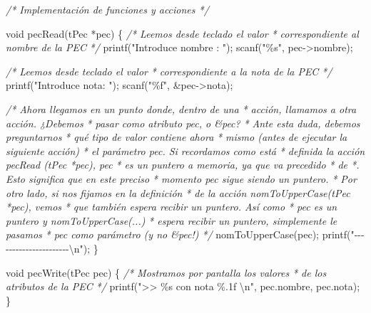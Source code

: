 \documentclass[
]{book}
\newenvironment{Shaded}{\begin{snugshade}}{\end{snugshade}}
\newcommand{\CommentTok}[1]{\textcolor[rgb]{0.56,0.35,0.01}{\textit{#1}}}
\newcommand{\DataTypeTok}[1]{\textcolor[rgb]{0.13,0.29,0.53}{#1}}
\newcommand{\NormalTok}[1]{#1}
\newcommand{\SpecialCharTok}[1]{\textcolor[rgb]{0.00,0.00,0.00}{#1}}
\newcommand{\StringTok}[1]{\textcolor[rgb]{0.31,0.60,0.02}{#1}}
\begin{document}
\begin{Shaded}
\begin{Highlighting}[]
\CommentTok{/* Implementación de funciones y acciones */}

\DataTypeTok{void}\NormalTok{ pecRead(tPec *pec) \{}
    \CommentTok{/* Leemos desde teclado el valor}
\CommentTok{     * correspondiente al nombre de la PEC}
\CommentTok{     */}
\NormalTok{    printf(}\StringTok{"Introduce nombre : "}\NormalTok{);}
\NormalTok{    scanf(}\StringTok{"\%s"}\NormalTok{, pec{-}\textgreater{}nombre);}

    \CommentTok{/* Leemos desde teclado el valor}
\CommentTok{     * correspondiente a la nota de la PEC}
\CommentTok{     */}
\NormalTok{    printf(}\StringTok{"Introduce nota: "}\NormalTok{);}
\NormalTok{    scanf(}\StringTok{"\%f"}\NormalTok{, \&pec{-}\textgreater{}nota);}
    
    \CommentTok{/* Ahora llegamos en un punto donde, dentro de una}
\CommentTok{     * acción, llamamos a otra acción. ¿Debemos}
\CommentTok{     * pasar como atributo pec, o \&pec?}
\CommentTok{     * Ante esta duda, debemos preguntarnos}
\CommentTok{     * qué tipo de valor contiene ahora}
\CommentTok{     * mismo (antes de ejecutar la siguiente acción)}
\CommentTok{     * el parámetro pec. Si recordamos como está}
\CommentTok{     * definida la acción pecRead (tPec *pec), pec}
\CommentTok{     * es un puntero a memoria, ya que va precedido}
\CommentTok{     * de *. Esto significa que en este preciso}
\CommentTok{     * momento pec sigue siendo un puntero.}
\CommentTok{     * Por otro lado, si nos fijamos en la definición}
\CommentTok{     * de la acción nomToUpperCase(tPec *pec), vemos}
\CommentTok{     * que también espera recibir un puntero. Así como}
\CommentTok{     * pec es un puntero y nomToUpperCase(...)}
\CommentTok{     * espera recibir un puntero, simplemente le pasamos}
\CommentTok{     * pec como parámetro (y no \&pec!)}
\CommentTok{     */}
\NormalTok{    nomToUpperCase(pec);}
\NormalTok{    printf(}\StringTok{"{-}{-}{-}{-}{-}{-}{-}{-}{-}{-}{-}{-}{-}{-}{-}{-}{-}{-}{-}{-}{-}{-}}\SpecialCharTok{\textbackslash{}n}\StringTok{"}\NormalTok{);}
\NormalTok{\}}

\DataTypeTok{void}\NormalTok{ pecWrite(tPec pec) \{}
    \CommentTok{/* Mostramos por pantalla los valores}
\CommentTok{     * de los atributos de la PEC}
\CommentTok{     */}
\NormalTok{    printf(}\StringTok{"\textgreater{}\textgreater{} \%s con nota \%.1f }\SpecialCharTok{\textbackslash{}n}\StringTok{"}\NormalTok{, pec.nombre, pec.nota);}
\NormalTok{\}}


\end{Highlighting}
\end{Shaded}
\end{document}
